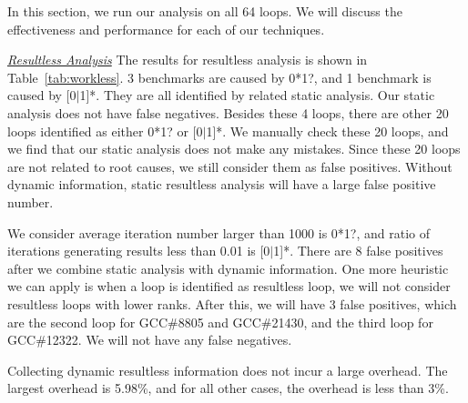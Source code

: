 In this section, we run our analysis on all 64 loops. 
We will discuss the effectiveness and performance for each of our techniques. 

\underline{\textit{Resultless Analysis}}
The results for resultless analysis is shown in Table~\ref{tab:workless}.
3 benchmarks are caused by 0*1?, and 1 benchmark is caused by [0$|$1]*. 
They are all identified by related static analysis. Our static analysis does not have false negatives. 
Besides these 4 loops, there are other 20 loops identified as either 0*1? or [0$|$1]*. 
We manually check these 20 loops, and we find that our static analysis does not make any mistakes. 
Since these 20 loops are not related to root causes, we still consider them as false positives. 
Without dynamic information, static resultless analysis will have a large false positive number. 

We consider average iteration number larger than 1000 is 0*1?, and ratio of iterations generating results less than 0.01 is [0$|$1]*. 
There are 8 false positives after we combine static analysis with dynamic information. 
One more heuristic we can apply is when a loop is identified as resultless loop, 
we will not consider resultless loops with lower ranks. After this, we will have 3 false positives, 
which are the second loop for GCC\#8805 and GCC\#21430, and the third loop for GCC\#12322. We will not have any false negatives. 

Collecting dynamic resultless information does not incur a large overhead. The largest overhead is 5.98\%, and for all other cases, the overhead is less than 3\%. 


